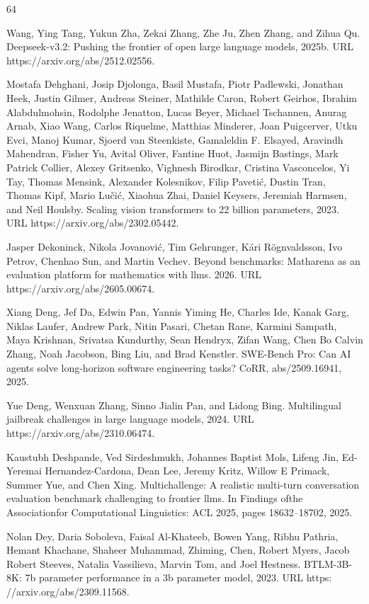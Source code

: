 \documentclass[
  10
]{article}
\begin{document}
64

Wang, Ying Tang, Yukun Zha, Zekai Zhang, Zhe Ju, Zhen Zhang, and Zihua
Qu. Deepseek-v3.2: Pushing the frontier of open large language models,
2025b. URL https://arxiv.org/abs/2512.02556.

Mostafa Dehghani, Josip Djolonga, Basil Mustafa, Piotr Padlewski,
Jonathan Heek, Justin Gilmer, Andreas Steiner, Mathilde Caron, Robert
Geirhos, Ibrahim Alabdulmohsin, Rodolphe Jenatton, Lucas Beyer, Michael
Tschannen, Anurag Arnab, Xiao Wang, Carlos Riquelme, Matthias Minderer,
Joan Puigcerver, Utku Evci, Manoj Kumar, Sjoerd van Steenkiste,
Gamaleldin F. Elsayed, Aravindh Mahendran, Fisher Yu, Avital Oliver,
Fantine Huot, Jasmijn Bastings, Mark Patrick Collier, Alexey Gritsenko,
Vighnesh Birodkar, Cristina Vasconcelos, Yi Tay, Thomas Mensink,
Alexander Kolesnikov, Filip Pavetić, Dustin Tran, Thomas Kipf, Mario
Lučić, Xiaohua Zhai, Daniel Keysers, Jeremiah Harmsen, and Neil Houlsby.
Scaling vision transformers to 22 billion parameters, 2023. URL
https://arxiv.org/abs/2302.05442.

Jasper Dekoninck, Nikola Jovanović, Tim Gehrunger, Kári Rögnvaldsson,
Ivo Petrov, Chenhao Sun, and Martin Vechev. Beyond benchmarks: Matharena
as an evaluation platform for mathematics with llms. 2026. URL
https://arxiv.org/abs/2605.00674.

Xiang Deng, Jef Da, Edwin Pan, Yannis Yiming He, Charles Ide, Kanak
Garg, Niklas Laufer, Andrew Park, Nitin Pasari, Chetan Rane, Karmini
Sampath, Maya Krishnan, Srivatsa Kundurthy, Sean Hendryx, Zifan Wang,
Chen Bo Calvin Zhang, Noah Jacobson, Bing Liu, and Brad Kenstler.
SWE-Bench Pro: Can AI agents solve long-horizon software engineering
tasks? CoRR, abs/2509.16941, 2025.

Yue Deng, Wenxuan Zhang, Sinno Jialin Pan, and Lidong Bing. Multilingual
jailbreak challenges in large language models, 2024. URL
https://arxiv.org/abs/2310.06474.

Kaustubh Deshpande, Ved Sirdeshmukh, Johannes Baptist Mols, Lifeng Jin,
Ed-Yeremai Hernandez-Cardona, Dean Lee, Jeremy Kritz, Willow E Primack,
Summer Yue, and Chen Xing. Multichallenge: A realistic multi-turn
conversation evaluation benchmark challenging to frontier llms. In
Findings ofthe Associationfor Computational Linguistics: ACL 2025, pages
18632--18702, 2025.

Nolan Dey, Daria Soboleva, Faisal Al-Khateeb, Bowen Yang, Ribhu Pathria,
Hemant Khachane, Shaheer Muhammad, Zhiming, Chen, Robert Myers, Jacob
Robert Steeves, Natalia Vassilieva, Marvin Tom, and Joel Hestness.
BTLM-3B-8K: 7b parameter performance in a 3b parameter model, 2023. URL
https: //arxiv.org/abs/2309.11568.
\end{document}
